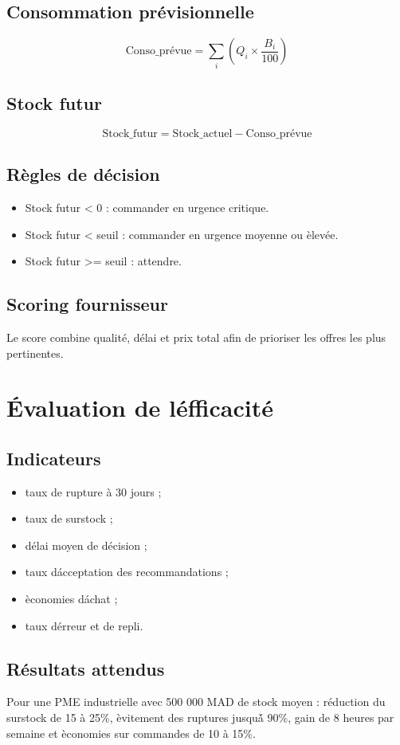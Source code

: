 \documentclass[12pt,a4paper]{report}
\begin{document}
\section{Consommation pr\'evisionnelle}
\[
\text{Conso\_pr\'evue} = \sum_{i} \left( Q_i \times \frac{B_i}{100} \right)
\]
\section{Stock futur}
\[
\text{Stock\_futur} = \text{Stock\_actuel} - \text{Conso\_pr\'evue}
\]
\section{R\`egles de d\'ecision}
\begin{itemize}
  \item Stock futur < 0 : commander en urgence critique.
  \item Stock futur < seuil : commander en urgence moyenne ou \`elev\'ee.
  \item Stock futur >= seuil : attendre.
\end{itemize}

\section{Scoring fournisseur}
Le score combine qualit\'e, d\'elai et prix total afin de prioriser les offres les plus pertinentes.

\cleardoublepage

\chapter{\'Evaluation de l\'efficacit\'e}
\section{Indicateurs}
\begin{itemize}
  \item taux de rupture \`a 30 jours ;
  \item taux de surstock ;
  \item d\'elai moyen de d\'ecision ;
  \item taux d\'acceptation des recommandations ;
  \item \`economies d\'achat ;
  \item taux d\'erreur et de repli.
\end{itemize}

\section{R\'esultats attendus}
Pour une PME industrielle avec 500 000 MAD de stock moyen : r\'eduction du surstock de 15 \`a 25\%, \`evitement des ruptures jusqu\'\`a 90\%, gain de 8 heures par semaine et \`economies sur commandes de 10 \`a 15\%.
\end{document}
